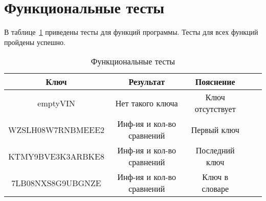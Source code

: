\clearpage

\section{Функциональные тесты}

В таблице~\ref{tbl:functional_test} приведены тесты для функций программы. Тесты для всех функций пройдены успешно.

\begin{center}
    \captionsetup{justification=raggedright,singlelinecheck=off}
    \begin{longtable}[c]{|c|c|c|c|c|}
    \caption{Функциональные тесты\label{tbl:functional_test}} \\ \hline
		Ключ & Результат & Пояснение \\ \hline
		emptyVIN & Нет такого ключа & Ключ отсутствует \\ \hline
		WZSLH08W7RNBMEEE2 & Инф-ия и кол-во сравнений & Первый ключ \\ \hline
		KTMY9BVE3K3ARBKE8 & Инф-ия и кол-во сравнений & Последний ключ \\ \hline
		7LB08NXS8G9UBGNZE & Инф-ия и кол-во сравнений & Ключ в словаре \\
		\hline
	\end{longtable}
\end{center}
